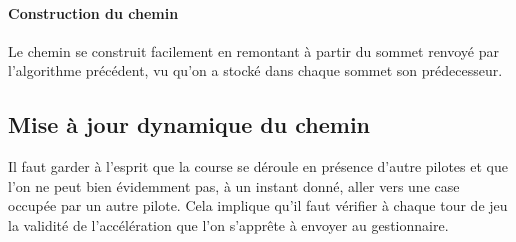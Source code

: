 \documentclass[a4paper,10pt]{article}
\begin{document}
\paragraph{Construction du chemin}
Le chemin se construit facilement en remontant à partir du sommet renvoyé par l'algorithme précédent, vu qu'on a stocké dans chaque sommet son prédecesseur.

\subsection{Mise à jour dynamique du chemin}
Il faut garder à l'esprit que la course se déroule en présence d'autre pilotes et que l'on ne peut bien évidemment pas, à un instant donné, aller vers une case occupée par un autre pilote.
Cela implique qu'il faut vérifier à chaque tour de jeu la validité de l'accélération que l'on s'apprête à envoyer au gestionnaire.
\end{document}
